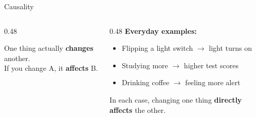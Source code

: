 \documentclass[9pt,english,aspectratio=169]{beamer}
\begin{document}
\begin{frame}{Causality}

  \begin{columns}[T]
    \begin{column}{0.48\textwidth}
      \begin{definitionbox}[Causality]
        One thing actually \textbf{changes} another.\\[0.3em]
        If you change A, it \textbf{affects} B.
      \end{definitionbox}

      \vspace{0.5em}
    \end{column}
    \begin{column}{0.48\textwidth}
      \vspace{0.5em} \pause 
      {\small\textbf{Everyday examples:}}

      \vspace{0.5em}
      \begin{itemize}
        \item Flipping a light switch $\rightarrow$ light turns on
        \item Studying more $\rightarrow$ higher test scores
        \item Drinking coffee $\rightarrow$ feeling more alert

      \end{itemize}

      \vspace{0.5em}
      {\small In each case, changing one thing \textbf{directly affects} the other.}
    \end{column}
  \end{columns}

\end{frame}
\end{document}
